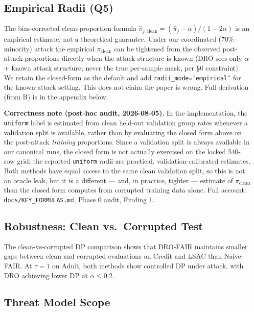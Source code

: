 \documentclass[11pt,a4paper]{article}
\begin{document}
\subsection{Empirical Radii (Q5)}

The bias-corrected clean-proportion formula
$\hat\pi_{j,\mathrm{clean}}=(\hat\pi_j-\alpha)/(1-2\alpha)$ is an
empirical estimate, not a theoretical guarantee.  Under our coordinated
(70\%-minority) attack the empirical $\pi_{\mathrm{clean}}$ can be
tightened from the observed post-attack proportions directly when the
attack structure is known (DRO sees only $\alpha$ + known attack structure; never the true per-sample mask, per §0 constraint).  We retain the closed-form as the default and
add \texttt{radii\_mode='empirical'} for the known-attack setting.
This does not claim the paper is wrong.
Full derivation (from B) is in the appendix below.

\textbf{Correctness note (post-hoc audit, 2026-08-05).} In the
implementation, the \texttt{uniform} label is estimated from clean
held-out validation group rates whenever a validation split is
available, rather than by evaluating the closed form above on the
post-attack \emph{training} proportions. Since a validation split is
always available in our canonical runs, the closed form is not actually
exercised on the locked 540-row grid; the reported \texttt{uniform}
radii are practical, validation-calibrated estimates. Both methods have
equal access to the same clean validation split, so this is not an
oracle leak, but it is a different --- and, in practice, tighter ---
estimate of $\pi_{\mathrm{clean}}$ than the closed form computes from
corrupted training data alone. Full account:
\texttt{docs/KEY\_FORMULAS.md}, Phase 0 audit, Finding 1.

\subsection{Robustness: Clean vs.\ Corrupted Test}

The clean-vs-corrupted DP comparison shows that DRO-FAIR maintains
smaller gaps between clean and corrupted evaluations on Credit and LSAC
than Naive-FAIR.  At $\tau{=}1$ on Adult, both methods show controlled
DP under attack, with DRO achieving lower DP at $\alpha\le0.2$.

\subsection{Threat Model Scope}
\end{document}
